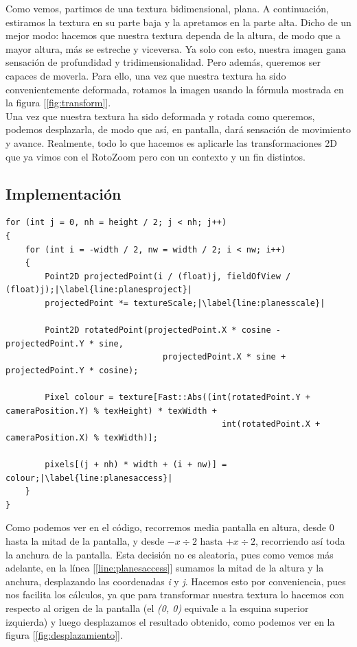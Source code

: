 Como vemos, partimos de una textura bidimensional, plana. A continuación, estiramos la textura en su parte baja y la apretamos en la parte alta. Dicho de un mejor modo: hacemos que nuestra textura dependa de la altura, de modo que a mayor altura, más se estreche y viceversa. Ya solo con esto, nuestra imagen gana sensación de profundidad y tridimensionalidad. Pero además, queremos ser capaces de moverla. Para ello, una vez que nuestra textura ha sido convenientemente deformada, rotamos la imagen usando la fórmula mostrada en la figura [\ref{fig:transform}].\\

Una vez que nuestra textura ha sido deformada y rotada como queremos, podemos desplazarla, de modo que así, en pantalla, dará sensación de movimiento y avance. Realmente, todo lo que hacemos es aplicarle las transformaciones 2D que ya vimos con el RotoZoom pero con un contexto y un fin distintos.

\subsection{Implementación}

\begin{lstlisting}[style=C-color, caption={Código para generar un efecto básico de planos infinitos, con escalado, rotación y translación}, label=cod:infiniteplanes, escapechar=|]
for (int j = 0, nh = height / 2; j < nh; j++)
{
    for (int i = -width / 2, nw = width / 2; i < nw; i++)
    {
        Point2D projectedPoint(i / (float)j, fieldOfView / (float)j);|\label{line:planesproject}|
        projectedPoint *= textureScale;|\label{line:planesscale}|
        
        Point2D rotatedPoint(projectedPoint.X * cosine - projectedPoint.Y * sine,
                                projectedPoint.X * sine + projectedPoint.Y * cosine);
                             
        Pixel colour = texture[Fast::Abs((int(rotatedPoint.Y + cameraPosition.Y) % texHeight) * texWidth +
                                            int(rotatedPoint.X + cameraPosition.X) % texWidth)];
                                         
        pixels[(j + nh) * width + (i + nw)] = colour;|\label{line:planesaccess}|
    }
}
\end{lstlisting}

Como podemos ver en el código, recorremos media pantalla en altura, desde 0 hasta la mitad de la pantalla, y desde \(-x \div 2\) hasta \(+x \div 2\), recorriendo así toda la anchura de la pantalla. Esta decisión no es aleatoria, pues como vemos más adelante, en la línea [\ref{line:planesaccess}] sumamos la mitad de la altura y la anchura, desplazando las coordenadas \emph{i} y \emph{j}. Hacemos esto por conveniencia, pues nos facilita los cálculos, ya que para transformar nuestra textura lo hacemos con respecto al origen de la pantalla (el \emph{(0, 0)} equivale a la esquina superior izquierda) y luego desplazamos el resultado obtenido, como podemos ver en la figura [\ref{fig:desplazamiento}].\\

